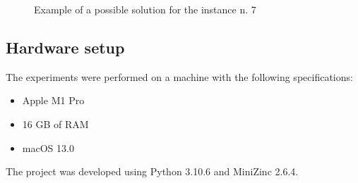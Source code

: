 \begin{figure}[!tbp]
  \centering
  \hfill
  \hfill
  \caption{Example of a possible solution for the instance n. 7}
\end{figure}

\subsection{Hardware setup}

The experiments were performed on a machine with the following specifications:

\begin{itemize}
    \item Apple M1 Pro
    \item 16 GB of RAM 
    \item macOS 13.0
\end{itemize}

The project was developed using Python 3.10.6 and MiniZinc 2.6.4.

